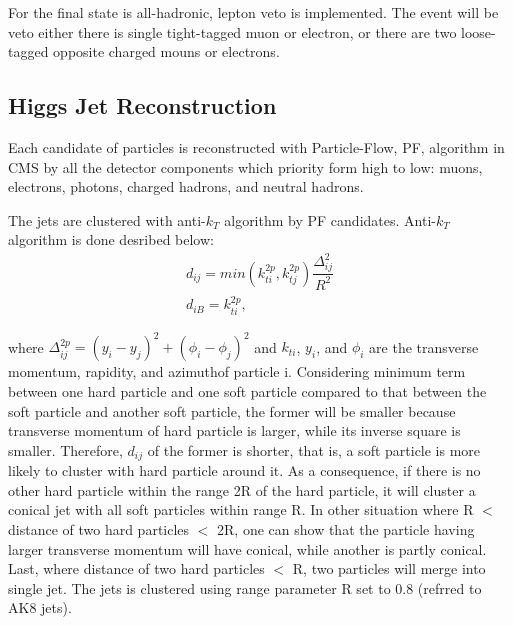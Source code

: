 For the final state is all-hadronic, lepton veto is implemented. The event will be veto either there is single tight-tagged muon or electron, or there are two loose-tagged opposite charged mouns or electrons.

\subsection{Higgs Jet Reconstruction} 
Each candidate of particles is reconstructed with Particle-Flow, PF, algorithm in CMS by all the detector components which priority form high to low: muons, electrons, photons, charged hadrons, and neutral hadrons.

The jets are clustered with anti-$k_{T}$ algorithm by PF candidates. Anti-$k_{T}$ algorithm is done desribed below: 
\begin{equation} \label{eq1}
\begin{split}
d_{ij} = min(k^{2p}_{ti},k^{2p}_{tj})\dfrac{\Delta ^2_{ij}}{R^2}\\
d_{iB} = k^{2p}_{ti} ,	
\end{split}
\end{equation}

where $\Delta ^{2p}_{ij}= (y_{i}-y_{j})^2+(\phi_{i}-\phi_{j})^2$ and $k_{ti}$, $y_{i}$, and $\phi _{i}$ are the transverse momentum, rapidity, and azimuthof particle i.
Considering minimum term between one hard particle and one soft particle compared to that between the soft particle and another soft particle, the former will be smaller because transverse momentum of hard particle is larger, while its inverse square is smaller. 
Therefore, $d_{ij}$ of the former is shorter, that is, a soft particle is more likely to cluster with hard particle around it. 
As a consequence, if there is no other hard particle within the range 2R of the hard particle, it will cluster a conical jet with all soft particles within range R. 
In other situation where R $<$ distance of two hard particles $<$ 2R, one can show that the particle having larger transverse momentum will have conical, while another is partly conical.
Last, where distance of two hard particles $<$ R, two particles will merge into single jet. The jets is clustered using range parameter R set to 0.8 (refrred to AK8 jets).

